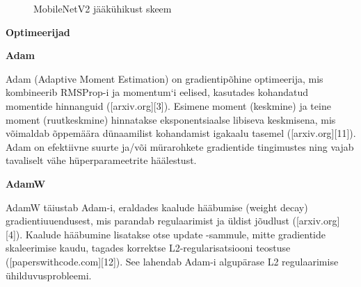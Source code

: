 \begin{figure}[H]
    \centering

    \caption{MobileNetV2 jääkühikust skeem}
    \label{fig:MobileNetV2jääkühikust}
\end{figure}

\textbf{Optimeerijad}

\textbf{Adam}

Adam (Adaptive Moment Estimation) on gradientipõhine optimeerija, mis kombineerib RMSProp-i ja momentum‘i eelised, kasutades kohandatud momentide hinnanguid ([arxiv.org][3]). Esimene moment (keskmine) ja teine moment (ruutkeskmine) hinnatakse eksponentsiaalse libiseva keskmisena, mis võimaldab õppemäära dünaamilist kohandamist igakaalu tasemel ([arxiv.org][11]). Adam on efektiivne suurte ja/või mürarohkete gradientide tingimustes ning vajab tavaliselt vähe hüperparameetrite häälestust.

\textbf{AdamW}

AdamW täiustab Adam-i, eraldades kaalude hääbumise (weight decay) gradientiuuendusest, mis parandab regulaarimist ja üldist jõudlust ([arxiv.org][4]). Kaalude hääbumine lisatakse otse update -sammule, mitte gradientide skaleerimise kaudu, tagades korrektse L2-regularisatsiooni teostuse ([paperswithcode.com][12]). See lahendab Adam-i algupärase L2 regulaarimise ühilduvusprobleemi.

